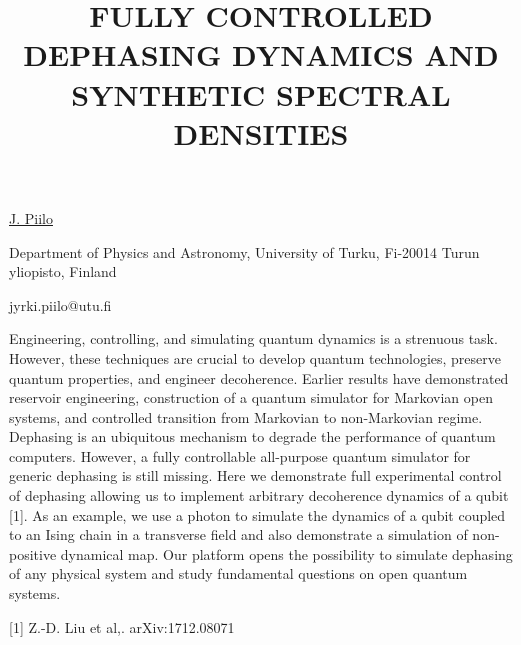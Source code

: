 \title{FULLY CONTROLLED DEPHASING DYNAMICS AND SYNTHETIC SPECTRAL DENSITIES}

\underline{J. Piilo} 

{\normalsize{\vspace{-4mm}
Department of Physics and Astronomy,
University of Turku,
Fi-20014 Turun yliopisto,
Finland



\email jyrki.piilo@utu.fi}}

Engineering, controlling, and simulating quantum dynamics is a strenuous task. However, these techniques are crucial to develop quantum technologies, preserve quantum properties, and engineer decoherence. Earlier results have demonstrated reservoir engineering, construction of a quantum simulator for Markovian open systems, and controlled transition from Markovian to non-Markovian regime. Dephasing is an ubiquitous mechanism to degrade the performance of quantum computers. However, a fully controllable all-purpose quantum simulator for generic dephasing is still missing. Here we demonstrate full experimental control of dephasing allowing us to implement arbitrary decoherence dynamics of a qubit [1]. As an example, we use a photon to simulate the dynamics of a qubit coupled to an Ising chain in a transverse field and also demonstrate a simulation of non-positive dynamical map. Our platform opens the possibility to simulate dephasing of any physical system and study fundamental questions on open quantum systems.

{\normalsize
[1] Z.-D. Liu et al,. arXiv:1712.08071
}

\vspace{\baselineskip}
